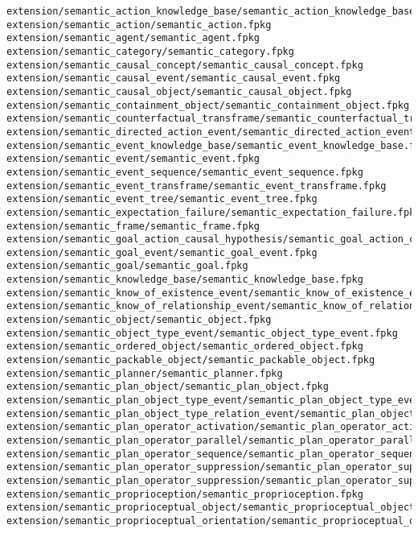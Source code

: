 \begin{lstlisting}
extension/semantic_action_knowledge_base/semantic_action_knowledge_base.fpkg
extension/semantic_action/semantic_action.fpkg
extension/semantic_agent/semantic_agent.fpkg
extension/semantic_category/semantic_category.fpkg
extension/semantic_causal_concept/semantic_causal_concept.fpkg
extension/semantic_causal_event/semantic_causal_event.fpkg
extension/semantic_causal_object/semantic_causal_object.fpkg
extension/semantic_containment_object/semantic_containment_object.fpkg
extension/semantic_counterfactual_transframe/semantic_counterfactual_transframe.fpkg
extension/semantic_directed_action_event/semantic_directed_action_event.fpkg
extension/semantic_event_knowledge_base/semantic_event_knowledge_base.fpkg
extension/semantic_event/semantic_event.fpkg
extension/semantic_event_sequence/semantic_event_sequence.fpkg
extension/semantic_event_transframe/semantic_event_transframe.fpkg
extension/semantic_event_tree/semantic_event_tree.fpkg
extension/semantic_expectation_failure/semantic_expectation_failure.fpkg
extension/semantic_frame/semantic_frame.fpkg
extension/semantic_goal_action_causal_hypothesis/semantic_goal_action_causal_hypothesis.fpkg
extension/semantic_goal_event/semantic_goal_event.fpkg
extension/semantic_goal/semantic_goal.fpkg
extension/semantic_knowledge_base/semantic_knowledge_base.fpkg
extension/semantic_know_of_existence_event/semantic_know_of_existence_event.fpkg
extension/semantic_know_of_relationship_event/semantic_know_of_relationship_event.fpkg
extension/semantic_object/semantic_object.fpkg
extension/semantic_object_type_event/semantic_object_type_event.fpkg
extension/semantic_ordered_object/semantic_ordered_object.fpkg
extension/semantic_packable_object/semantic_packable_object.fpkg
extension/semantic_planner/semantic_planner.fpkg
extension/semantic_plan_object/semantic_plan_object.fpkg
extension/semantic_plan_object_type_event/semantic_plan_object_type_event.fpkg
extension/semantic_plan_object_type_relation_event/semantic_plan_object_type_relation_event.fpkg
extension/semantic_plan_operator_activation/semantic_plan_operator_activation.fpkg
extension/semantic_plan_operator_parallel/semantic_plan_operator_parallel.fpkg
extension/semantic_plan_operator_sequence/semantic_plan_operator_sequence.fpkg
extension/semantic_plan_operator_suppression/semantic_plan_operator_suppession.fpkg
extension/semantic_plan_operator_suppression/semantic_plan_operator_suppression.fpkg
extension/semantic_proprioception/semantic_proprioception.fpkg
extension/semantic_proprioceptual_object/semantic_proprioceptual_object.fpkg
extension/semantic_proprioceptual_orientation/semantic_proprioceptual_orientation.fpkg

\end{lstlisting}
